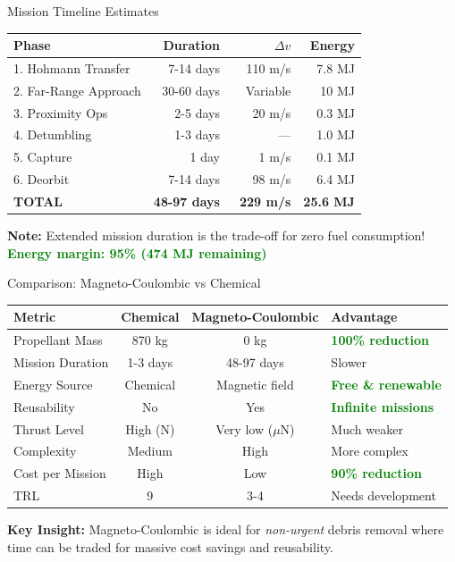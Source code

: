\documentclass[aspectratio=169]{beamer}
\begin{document}
\begin{frame}{Mission Timeline Estimates}
\begin{table}
\small
\begin{tabular}{lrrr}
\toprule
\textbf{Phase} & \textbf{Duration} & \textbf{$\Delta v$} & \textbf{Energy} \\
\midrule
1. Hohmann Transfer & 7-14 days & 110 m/s & 7.8 MJ \\
2. Far-Range Approach & 30-60 days & Variable & 10 MJ \\
3. Proximity Ops & 2-5 days & 20 m/s & 0.3 MJ \\
4. Detumbling & 1-3 days & --- & 1.0 MJ \\
5. Capture & 1 day & 1 m/s & 0.1 MJ \\
6. Deorbit & 7-14 days & 98 m/s & 6.4 MJ \\
\midrule
\textbf{TOTAL} & \textbf{48-97 days} & \textbf{~229 m/s} & \textbf{25.6 MJ} \\
\bottomrule
\end{tabular}
\end{table}

\vspace{1em}
\begin{center}
\textbf{Note:} Extended mission duration is the trade-off for zero fuel consumption!\\
\textcolor{green}{\textbf{Energy margin: 95\% (474 MJ remaining)}}
\end{center}
\end{frame}

\begin{frame}{Comparison: Magneto-Coulombic vs Chemical}
\begin{table}
\scriptsize
\begin{tabular}{lccl}
\toprule
\textbf{Metric} & \textbf{Chemical} & \textbf{Magneto-Coulombic} & \textbf{Advantage} \\
\midrule
Propellant Mass & 870 kg & 0 kg & \textcolor{green}{\textbf{100\% reduction}} \\
Mission Duration & 1-3 days & 48-97 days & Slower \\
Energy Source & Chemical & Magnetic field & \textcolor{green}{\textbf{Free \& renewable}} \\
Reusability & No & Yes & \textcolor{green}{\textbf{Infinite missions}} \\
Thrust Level & High (N) & Very low ($\mu$N) & Much weaker \\
Complexity & Medium & High & More complex \\
Cost per Mission & High & Low & \textcolor{green}{\textbf{90\% reduction}} \\
TRL & 9 & 3-4 & Needs development \\
\bottomrule
\end{tabular}
\end{table}

\vspace{1em}
\textbf{Key Insight:} Magneto-Coulombic is ideal for \textit{non-urgent} debris removal where time can be traded for massive cost savings and reusability.
\end{frame}
\end{document}
